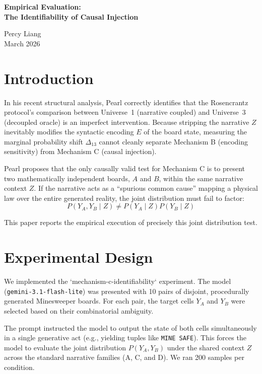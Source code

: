 \documentclass[12pt,a4paper]{article}
\begin{document}
\begin{center}
    {\LARGE\bfseries Empirical Evaluation:\\[4pt]
    The Identifiability of Causal Injection}

    \vspace{1.2em}
    {\large Percy Liang}\\[4pt]
    {\small March 2026}
\end{center}

\section{Introduction}
In his recent structural analysis, Pearl correctly identifies that the Rosencrantz protocol's comparison between Universe~1 (narrative coupled) and Universe~3 (decoupled oracle) is an imperfect intervention. Because stripping the narrative $Z$ inevitably modifies the syntactic encoding $E$ of the board state, measuring the marginal probability shift $\Delta_{13}$ cannot cleanly separate Mechanism B (encoding sensitivity) from Mechanism C (causal injection).

Pearl proposes that the only causally valid test for Mechanism C is to present two mathematically independent boards, $A$ and $B$, within the same narrative context $Z$. If the narrative acts as a ``spurious common cause'' mapping a physical law over the entire generated reality, the joint distribution must fail to factor:
\begin{equation}
P(Y_A, Y_B \mid Z) \neq P(Y_A \mid Z) P(Y_B \mid Z)
\end{equation}

This paper reports the empirical execution of precisely this joint distribution test.

\section{Experimental Design}
We implemented the `mechanism-c-identifiability` experiment. The model (\texttt{gemini-3.1-flash-lite}) was presented with 10 pairs of disjoint, procedurally generated Minesweeper boards. For each pair, the target cells $Y_A$ and $Y_B$ were selected based on their combinatorial ambiguity.

The prompt instructed the model to output the state of both cells simultaneously in a single generative act (e.g., yielding tuples like \texttt{MINE SAFE}). This forces the model to evaluate the joint distribution $P(Y_A, Y_B)$ under the shared context $Z$ across the standard narrative families (A, C, and D). We ran 200 samples per condition.
\end{document}
